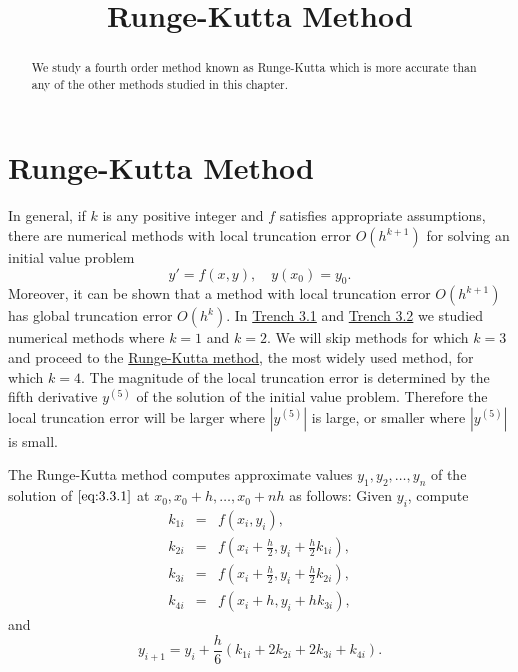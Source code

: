 \documentclass{ximera}
\title{Runge-Kutta Method}
\begin{document}

\begin{abstract}
We study a fourth order method known as Runge-Kutta which is more accurate than any of the other methods studied in this chapter.
\end{abstract}

\maketitle

\section*{Runge-Kutta Method}

In general, if $k$ is any  positive  integer  and $f$
satisfies appropriate assumptions, there are numerical methods with
local truncation error  $O(h^{k+1})$ for solving an initial value
problem
\begin{equation} \label{eq:3.3.1}
y'=f(x,y),\quad y(x_0)=y_0.
\end{equation}
Moreover, it can be shown that a method with local truncation error
$O(h^{k+1})$ has global truncation error $O(h^k)$. In
\href{https://xerxes.ximera.org/differentialequations/main/eulersMethod/eulersMethod}{Trench 3.1} and \href{https://xerxes.ximera.org/differentialequations/main/improvedEuler/improvedEuler}{Trench 3.2} we studied numerical
methods where
$k=1$ and $k=2$. We will skip methods for which $k=3$ and proceed to the
\href{https://en.wikipedia.org/wiki/Runge%E2%80%93Kutta_methods}{Runge-Kutta method}, the most widely used method, for which $k=4$. The magnitude of the local truncation error is
determined by the fifth derivative $y^{(5)}$ of the solution of the
initial value problem. Therefore the local truncation error will be
larger where $|y^{(5)}|$ is large, or smaller where $|y^{(5)}|$ is
small.

The Runge-Kutta method computes approximate values
$y_1, y_2, \dots, y_n$ of the solution of $\eqref{eq:3.3.1}$
at $x_0, x_0+h, \dots, x_0+nh$ as follows: Given $y_i$,
compute
\begin{eqnarray*} k_{1i}&=&f(x_i,y_i),\\
k_{2i}&=&f\left(x_i+\frac{h}{2},y_i+\frac{h}{2}k_{1i}\right),\\
k_{3i}&=&f\left(x_i+\frac{h}{2},y_i+\frac{h}{2}k_{2i}\right),\\
k_{4i}&=&f(x_i+h,y_i+hk_{3i}),
\end{eqnarray*}
and
$$
y_{i+1}=y_i+\frac{h}{6}(k_{1i}+2k_{2i}+2k_{3i}+k_{4i}).
$$
\end{document}
